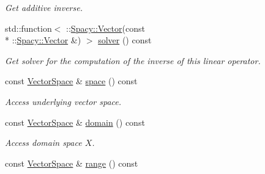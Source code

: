 \begin{DoxyCompactItemize}
\begin{DoxyCompactList}\small\item\em Get additive inverse. \end{DoxyCompactList}\item 
\hypertarget{structSpacy_1_1Scalar_1_1LinearOperator_aa4b25737fbff5a431545ae5076e2c0c0}{std\-::function$<$ \-::\hyperlink{classSpacy_1_1Vector}{Spacy\-::\-Vector}(const \\*
\-::\hyperlink{classSpacy_1_1Vector}{Spacy\-::\-Vector} \&) $>$ \hyperlink{structSpacy_1_1Scalar_1_1LinearOperator_aa4b25737fbff5a431545ae5076e2c0c0}{solver} () const }\label{structSpacy_1_1Scalar_1_1LinearOperator_aa4b25737fbff5a431545ae5076e2c0c0}

\begin{DoxyCompactList}\small\item\em Get solver for the computation of the inverse of this linear operator. \end{DoxyCompactList}\item 
\hypertarget{classSpacy_1_1VectorBase_aa999dbf9d679d895dfe04c10fbf9f5e9}{const \hyperlink{classSpacy_1_1VectorSpace}{Vector\-Space} \& \hyperlink{classSpacy_1_1VectorBase_aa999dbf9d679d895dfe04c10fbf9f5e9}{space} () const }\label{classSpacy_1_1VectorBase_aa999dbf9d679d895dfe04c10fbf9f5e9}

\begin{DoxyCompactList}\small\item\em Access underlying vector space. \end{DoxyCompactList}\item 
\hypertarget{classSpacy_1_1OperatorBase_a2588f9b3e0188820c4c494e63293dc6f}{const \hyperlink{classSpacy_1_1VectorSpace}{Vector\-Space} \& \hyperlink{classSpacy_1_1OperatorBase_a2588f9b3e0188820c4c494e63293dc6f}{domain} () const }\label{classSpacy_1_1OperatorBase_a2588f9b3e0188820c4c494e63293dc6f}

\begin{DoxyCompactList}\small\item\em Access domain space $X$. \end{DoxyCompactList}\item 
\hypertarget{classSpacy_1_1OperatorBase_ab19d3b7a6f290b1079248f1e567e53d6}{const \hyperlink{classSpacy_1_1VectorSpace}{Vector\-Space} \& \hyperlink{classSpacy_1_1OperatorBase_ab19d3b7a6f290b1079248f1e567e53d6}{range} () const }\label{classSpacy_1_1OperatorBase_ab19d3b7a6f290b1079248f1e567e53d6}


\end{DoxyCompactItemize}
